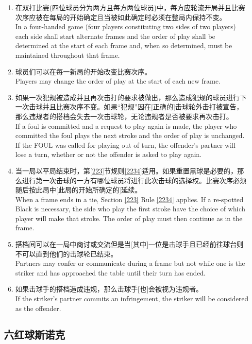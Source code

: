\begin{enumerate}[label=(\alph*)]
    \item 在双打比赛(四位球员分为两方且每方两位球员)中，每方应轮流开局并且比赛次序应被在每局的开始确定且当被如此确定时必须在整局内保持不变。\\
    In a four-handed game (four players constituting two sides of two players) each side shall start alternate frames and the order of play shall be determined at the start of each frame and, when so determined, must be maintained throughout that frame.
    \item 球员们可以在每一新局的开始改变比赛次序。\\
    Players may change the order of play at the start of each new frame.
    \item 如果一次犯规被造成并且再次击打的要求被做出，那么造成犯规的球员进行下一次击球并且比赛次序不变。如果``犯规''因在[正确的]击球轮外击打被宣告，那么违规者的搭档会失去一次击球轮，无论违规者是否被要求再次击打。\\
    If a foul is committed and a request to play again is made, the player who committed the foul plays the next stroke and the order of play is unchanged. If the FOUL was called for playing out of turn, the offender's partner will lose a turn, whether or not the offender is asked to play again.
    \item 当一局以平局结束时，第\ref{223}节规则\ref{2234}适用。如果重置黑球是必要的，那么进行第一次击球的一方有哪位球员将进行此次击球的选择权。比赛次序必须随后按此局中[此局的开始所确定的]延续。\\
    When a frame ends in a tie, Section \ref{223} Rule \ref{2234} applies. If a re-spotted Black is necessary, the side who play the first stroke have the choice of which player will make that stroke. The order of play must then continue as in the frame.
    \item \label{22318e}搭档间可以在一局中商讨或交流但是当[其中]一位是击球手且已经前往球台则不可以直到他们的击球轮已结束。\\
    Partners may confer or communicate during a frame but not while one is the striker and has approached the table until their turn has ended. 
    \item 如果击球手的搭档造成违规，那么击球手[也]会被视为违规者。\\
    If the striker's partner commits an infringement, the striker will be considered as the offender.
\end{enumerate}

\subsection{六红球斯诺克}


